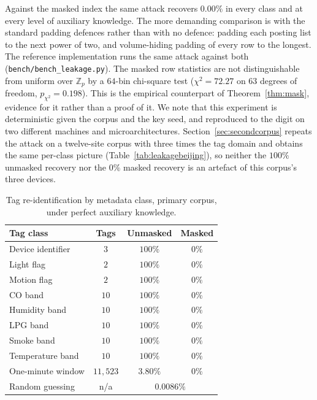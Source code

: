 \documentclass[a4paper,fleqn]{cas-dc}
\newif\ifauthorchecks
\newcommand{\authorcheck}[1]{\ifauthorchecks{\color{red}\textsf{[Authors: #1]}}\fi}
\begin{document}
Against the masked index the same attack recovers $0.00\%$ in every class and
at every level of auxiliary knowledge. The more demanding comparison is with
the standard padding defences rather than with no defence: padding each
posting list to the next power of two, and volume-hiding padding of every
row to the longest. The reference implementation runs the same attack against
both (\texttt{bench/bench\_leakage.py}).
\authorcheck{Run bench/bench\_leakage.py on both corpora and add the padded
and volume-hiding columns to Tables~\ref{tab:leakage}
and~\ref{tab:leakagebeijing}; the raw files could not be fetched where the
reference results were produced.} The masked row statistics are not
distinguishable from uniform over $\mathbb{Z}_p$ by a $64$-bin chi-square test
($\chi^2=72.27$ on $63$ degrees of freedom, $p_{\chi^2}=0.198$). This is the
empirical counterpart of Theorem~\ref{thm:mask}, evidence for it rather than a
proof of it. We note that this experiment is deterministic given the corpus
and the key seed, and reproduced to the digit on two different machines and
microarchitectures. Section~\ref{sec:secondcorpus} repeats the attack on a
twelve-site corpus with three times the tag domain and obtains the same
per-class picture (Table~\ref{tab:leakagebeijing}), so neither the $100\%$
unmasked recovery nor the $0\%$ masked recovery is an artefact of this
corpus's three devices.

\begin{table}[pos=t]
\caption{Tag re-identification by metadata class, primary corpus, under
perfect auxiliary knowledge.}
\label{tab:leakage}
\centering
\footnotesize
\setlength{\tabcolsep}{3pt}
\renewcommand{\arraystretch}{1.15}
\begin{tabular*}{\tblwidth}{@{\extracolsep{\fill}}lccc@{}}
\toprule
Tag class & Tags & Unmasked & Masked \\
\midrule
Device identifier      & $3$      & $100\%$ & $0\%$ \\
Light flag             & $2$      & $100\%$ & $0\%$ \\
Motion flag            & $2$      & $100\%$ & $0\%$ \\
CO band                & $10$     & $100\%$ & $0\%$ \\
Humidity band          & $10$     & $100\%$ & $0\%$ \\
LPG band               & $10$     & $100\%$ & $0\%$ \\
Smoke band             & $10$     & $100\%$ & $0\%$ \\
Temperature band       & $10$     & $100\%$ & $0\%$ \\
One-minute window      & $11{,}523$ & $3.80\%$ & $0\%$ \\
\midrule
Random guessing        & n/a      & \multicolumn{2}{c}{$0.0086\%$} \\
\bottomrule
\end{tabular*}
\end{table}
\end{document}
